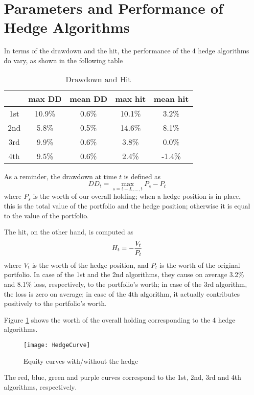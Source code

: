 \documentclass{article}
\begin{document}
\section{Parameters and Performance of Hedge Algorithms}
In terms of the drawdown and the hit, the performance of the 4 hedge
algorithms do vary, as shown in the following table
  \begin{table}[htb!]
    \centering
    \begin{tabular}{|c|c|c|c|c|}
      \hline
      & max DD & mean DD & max hit & mean hit \\
      \hline
      1st & 10.9\% &  0.6\% &  10.1\% &  3.2\% \\
      \hline
      2nd & 5.8\% &   0.5\% &  14.6\% &  8.1\% \\
      \hline
      3rd & 9.9\% &   0.6\% &  3.8\% &   0.0\% \\
      \hline
      4th & 9.5\% &   0.6\% &  2.4\% &  -1.4\% \\
      \hline
    \end{tabular}
    \caption{Drawdown and Hit}
    \label{tab:dd_hit}
  \end{table}
  As a reminder, the drawdown at time $t$ is defined as
  \[
    DD_t = \max_{s=t-L,\dots,t} P_s - P_t
  \]
  where $P_s$ is the worth of our overall holding; when a hedge
  position is in place, this is the total value of the portfolio and
  the hedge position; otherwise it is equal to the value of the
  portfolio.

  The hit, on the other hand, is computed as
  \[
    H_t = -{V_t \over P_t}
  \]
  where $V_t$ is the worth of the hedge position, and $P_t$ is the
  worth of the original portfolio. In case of the 1st and the 2nd
  algorithms, they cause on average 3.2\% and 8.1\% loss,
  respectively, to the portfolio's worth; in case of the 3rd
  algorithm, the loss is zero on average; in case of the 4th
  algorithm, it actually contributes positively to the portfolio's
  worth.

  Figure \ref{fig:hedge_performance} shows the worth of the
  overall holding corresponding to the 4 hedge algorithms.
  \begin{figure}[htb!]
    \centering
    \texttt{[image: HedgeCurve]}
    \caption{Equity curves with/without the hedge}
    \label{fig:hedge_performance}
  \end{figure}
  The red, blue, green and purple curves correspond to the 1st, 2nd,
  3rd and 4th algorithms, respectively.


\end{document}
